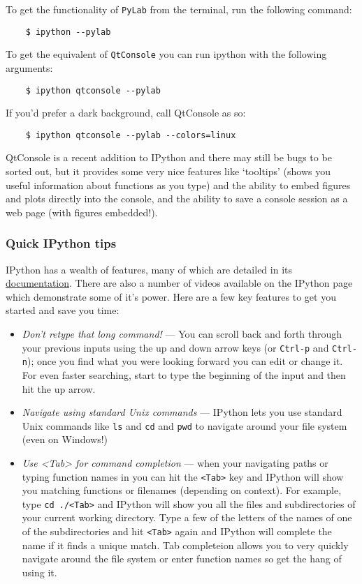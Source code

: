 \documentclass{article}
\begin{document}
To get the functionality of \lstinline!PyLab! from the terminal, run the
following command:

\begin{lstlisting}
    $ ipython --pylab
\end{lstlisting}
To get the equivalent of \lstinline!QtConsole! you can run ipython with
the following arguments:

\begin{lstlisting}
    $ ipython qtconsole --pylab
\end{lstlisting}
If you'd prefer a dark background, call QtConsole as so:

\begin{lstlisting}
    $ ipython qtconsole --pylab --colors=linux
\end{lstlisting}
QtConsole is a recent addition to IPython and there may still be bugs to
be sorted out, but it provides some very nice features like `tooltips'
(shows you useful information about functions as you type) and the
ability to embed figures and plots directly into the console, and the
ability to save a console session as a web page (with figures
embedded!).

\subsubsection{Quick IPython tips}

IPython has a wealth of features, many of which are detailed in its
\href{http://ipython.org/documentation.html}{documentation}. There are
also a number of videos available on the IPython page which demonstrate
some of it's power. Here are a few key features to get you started and
save you time:

\begin{itemize}
\item
  \emph{Don't retype that long command!} --- You can scroll back and
  forth through your previous inputs using the up and down arrow keys
  (or \lstinline!Ctrl-p! and \lstinline!Ctrl-n!); once you find what you
  were looking forward you can edit or change it. For even faster
  searching, start to type the beginning of the input and then hit the
  up arrow.
\item
  \emph{Navigate using standard Unix commands} --- IPython lets you use
  standard Unix commands like \lstinline!ls! and \lstinline!cd! and
  \lstinline!pwd! to navigate around your file system (even on Windows!)
\item
  \emph{Use \textless{}Tab\textgreater{} for command completion} ---
  when your navigating paths or typing function names in you can hit the
  \lstinline!<Tab>! key and IPython will show you matching functions or
  filenames (depending on context). For example, type
  \lstinline!cd ./<Tab>! and IPython will show you all the files and
  subdirectories of your current working directory. Type a few of the
  letters of the names of one of the subdirectories and hit
  \lstinline!<Tab>! again and IPython will complete the name if it finds
  a unique match. Tab completeion allows you to very quickly navigate
  around the file system or enter function names so get the hang of
  using it.
\end{itemize}
\end{document}
